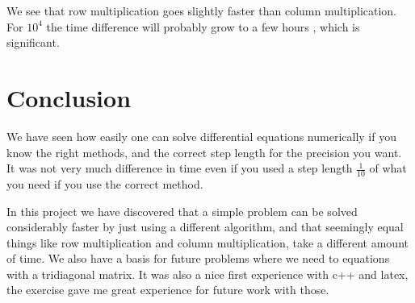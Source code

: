 \documentclass[12pt,a4wide]{article}
\begin{document}
We see that row multiplication goes slightly faster than column multiplication. For ${10^4}$ the time difference will probably grow to a few hours , which is significant.

\section*{Conclusion}
We have seen how easily one can solve differential equations numerically if you know the right methods, and the correct step length for the precision you want. It was not 
very much difference in time even if you used a step length $\frac{1}{10}$ of what you need if you use the correct method. 

In this project we have discovered that a simple problem can be solved considerably faster by just using a different algorithm, and that seemingly equal things
like row multiplication and column multiplication, take a different amount of time. We also have a basis for future problems where we need to equations with a tridiagonal matrix. 
It was also a nice first experience with c++ and latex, the exercise gave me great experience for future work with those. 
\end{document}
